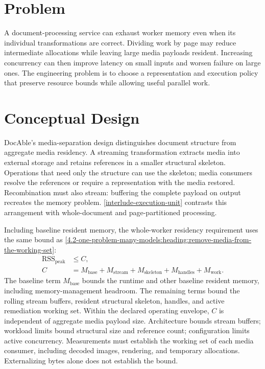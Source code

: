 
\section{Problem}

A document-processing service can exhaust worker memory even when its individual transformations are correct. Dividing work by page may reduce intermediate allocations while leaving large media payloads resident. Increasing concurrency can then improve latency on small inputs and worsen failure on large ones. The engineering problem is to choose a representation and execution policy that preserve resource bounds while allowing useful parallel work.

\section{Conceptual Design}

DocAble's media-separation design distinguishes document structure from aggregate media residency. A streaming transformation extracts media into external storage and retains references in a smaller structural skeleton. Operations that need only the structure can use the skeleton; media consumers resolve the references or require a representation with the media restored. Recombination must also stream: buffering the complete payload on output recreates the memory problem. \autoref{interlude-execution-unit} contrasts this arrangement with whole-document and page-partitioned processing.

Including baseline resident memory, the whole-worker residency requirement uses the same bound as \autoref{4.2-one-problem-many-models:heading:remove-media-from-the-working-set}:
\[
\begin{aligned}
\operatorname{RSS}_{\mathrm{peak}} &\le C,\\
C &= M_{\mathrm{base}} + M_{\mathrm{stream}} + M_{\mathrm{skeleton}}
   + M_{\mathrm{handles}} + M_{\mathrm{work}}.
\end{aligned}
\]
The baseline term \(M_{\mathrm{base}}\) bounds the runtime and other baseline resident memory, including memory-management headroom. The remaining terms bound the rolling stream buffers, resident structural skeleton, handles, and active remediation working set. Within the declared operating envelope, \(C\) is independent of aggregate media payload size. Architecture bounds stream buffers; workload limits bound structural size and reference count; configuration limits active concurrency. Measurements must establish the working set of each media consumer, including decoded images, rendering, and temporary allocations. Externalizing bytes alone does not establish the bound.


